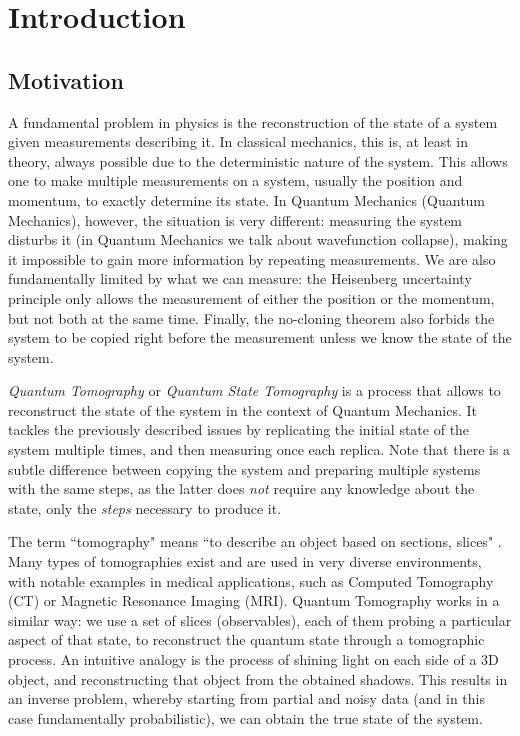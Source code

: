 \documentclass[12pt]{memoir}
\begin{document}
\chapter{Introduction}

\section{Motivation}
A fundamental problem in physics is the reconstruction of the state of a system given measurements describing it. In classical mechanics, this is, at least in theory, always possible due to the deterministic nature of the system. This allows one to make multiple measurements on a system, usually the position and momentum, to exactly determine its state. In Quantum Mechanics (Quantum Mechanics), however, the situation is very different: measuring the system disturbs it (in Quantum Mechanics we talk about wavefunction collapse), making it impossible to gain more information by repeating measurements. We are also fundamentally limited by what we can measure: the Heisenberg uncertainty principle only allows the measurement of either the position or the momentum, but not both at the same time. Finally, the no-cloning theorem also forbids the system to be copied right before the measurement unless we know the state of the system.\medbreak

\textit{Quantum Tomography} or \textit{Quantum State Tomography} is a process that allows to reconstruct the state of the system in the context of Quantum Mechanics. It tackles the previously described issues by replicating the initial state of the system multiple times, and then measuring once each replica. Note that there is a subtle difference between copying the system and preparing multiple systems with the same steps, as the latter does \textit{not} require any knowledge about the state, only the \textit{steps} necessary to produce it.\medbreak

The term ``tomography" means ``to describe an object based on sections, slices" \cite{wiki:tomography}. Many types of tomographies exist and are used in very diverse environments, with notable examples in medical applications, such as Computed Tomography (CT) or Magnetic Resonance Imaging (MRI). Quantum Tomography works in a similar way: we use a set of slices (observables), each of them probing a particular aspect of that state, to reconstruct the quantum state through a tomographic process. An intuitive analogy is the process of shining light on each side of a 3D object, and reconstructing that object from the obtained shadows. This results in an inverse problem, whereby starting from partial and noisy data (and in this case fundamentally probabilistic), we can obtain the true state of the system.
\end{document}
